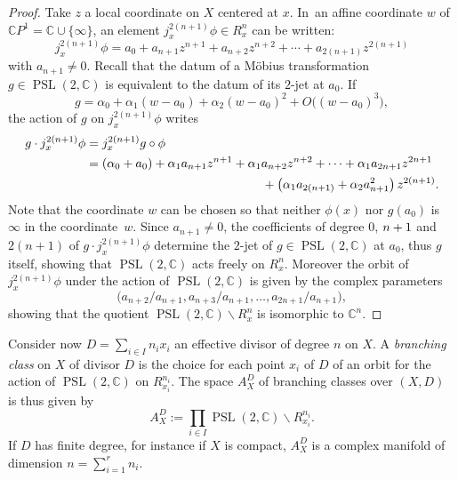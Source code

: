 \documentclass[JEP,XML,SOM,Unicode,NoEqCountersInSection,published]{cedram}
\newcommand{\C}{\mathbb C}
\newcommand{\CP}{\mathbb CP}
\DeclareMathOperator{\PSL}{PSL}
\theoremstyle{definition}
\theoremstyle{plain}
\begin{document}
\begin{proof}
Take $z$ a local coordinate on $X$ centered at $x$. In~an affine coordinate $w$ of $\CP^1 = \C \cup \{\infty\}$, an element $j_x^{2(n+1)} \phi \in R_x^n$ can be written:
\begin{equation*}
j^{2(n+1)}_x \phi = a_0 + a_{n+1} z^{n+1} + a_{n+2}z^{n+2} + \cdots + a_{2(n+1)}z^{2(n+1)}
\end{equation*}
with $a_{n+1} \neq 0$.
Recall that the datum of a Möbius transformation $g \in \PSL(2, \C)$ is equivalent to the datum of its $2$-jet at $a_0$.
If
\[
g = \alpha_0 + \alpha_1 (w-a_0) + \alpha_2 (w-a_0)^2 + O\bigl((w-a_0)^3\bigr),
\]
the action of $g$ on $j^{2(n+1)}_x \phi$ writes
\begin{equation*}
\begin{aligned}
g \cdot j^{2(n+1)}_x \phi &= j^{2(n+1)}_x g \circ \phi \\
&= \left(\alpha_0 + a_0\right) + \alpha_1 a_{n+1} z^{n+1} + \alpha_1 a_{n+2} z^{n+2} + \cdots + \alpha_1 a_{2n+1} z^{2n+1} \\
&\hspace*{5cm}+ \left(\alpha_1 a_{2(n+1)} + \alpha_2 a_{n+1}^2\right) z^{2(n+1)}.
\end{aligned}
\end{equation*}
Note that the coordinate $w$ can be chosen so that neither $\phi(x)$ nor $g(a_0)$ is~$\infty$ in the coordinate~$w$.
Since $a_{n+1}\!\neq\! 0$, the coefficients of degree $0$, $n+\nobreak1$ and $2(n+1)$ of $g \cdot j^{2(n+1)}_x \phi$ determine the $2$-jet of $g \in \PSL(2, \C)$ at $a_0$, thus $g$ itself, showing that $\PSL(2, \C)$ acts freely on $R_x^n$.
Moreover the orbit of $j^{2(n+1)}_x \phi$ under the action of $\PSL(2, \C)$ is given by the complex parameters
\[
\bigl(a_{n+2}/a_{n+1}, a_{n+3}/a_{n+1}, \dots, a_{2n+1}/a_{n+1}\bigr),
\]
showing that the quotient $\PSL(2, \C) \backslash R_x^n$ is isomorphic to $\C^n$.
\end{proof}

Consider now $D = \sum_{i \in I} n_i x_i$ an effective divisor of degree $n$ on $X$. A \emph{branching class} on $X$ of divisor $D$ is the choice for each point $x_i$ of $D$ of an orbit for the action of $\PSL(2, \C)$ on $R_{x_i}^{n_i}$.
The space $A_X^D$ of branching classes over $(X, D)$ is thus given by
\begin{equation*}
A_X^D:= \prod_{i \in I} \PSL(2, \C) \backslash R_{x_i}^{n_i}.
\end{equation*}
If $D$ has finite degree, for instance if $X$ is compact, $A_X^D$ is a complex manifold of dimension $n = \sum_{i=1}^r n_i$.
\end{document}
